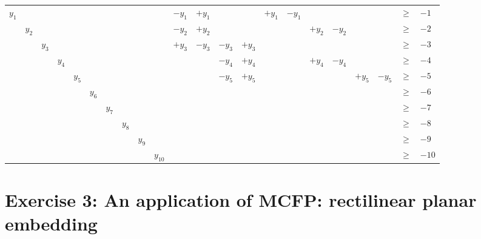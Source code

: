 \documentclass[11pt,a4paper,english]{article}
\begin{document}
\begin{table}[H]
  \begin{tabular}{rrrrrrrrrrrrrrrrrrrrr}
$y_1$  & ~     & ~     & ~     & ~     & ~     & ~     & ~     & ~    & ~     & $-y_1$ & $+y_1$ & ~     & ~     & $+y_1$ & $-y_1$ & ~     & ~      & ~ & ~  & $\geq$ & $-1$\\
~      & $y_2$ & ~     & ~     & ~     & ~     & ~     & ~     & ~    & ~     & $-y_2$ & $+y_2$ & ~     & ~     & ~     & ~      & $+y_2$ & $-y_2$ & ~ & ~  & $\geq$ & $-2$\\
~      & ~     & $y_3$ & ~     & ~     & ~     & ~     & ~     & ~    & ~     & $+y_3$ & $-y_3$ & $-y_3$ & $+y_3$ & ~   & ~      & ~     & ~     & ~ & ~    & $\geq$ & $-3$\\
~      & ~     & ~     & $y_4$ & ~     & ~     & ~     & ~     & ~    & ~     & ~      & ~      & $-y_4$ & $+y_4$ & ~   & ~      & $+y_4$& $-y_4$& ~ & ~    & $\geq$ & $-4$\\
~      & ~     & ~     & ~     & $y_5$ & ~     & ~     & ~     & ~    & ~     & ~      & ~      & $-y_5$ & $+y_5$ & ~   & ~ & ~   & ~     & $+y_5$ & $-y_5$ & $\geq$ & $-5$\\
~      & ~     & ~     & ~     & ~     & $y_6$ & ~     & ~     & ~    & ~     & ~      & ~      & ~     & ~     & ~     & ~      & ~     & ~     & ~ & ~    & $\geq$ & $-6$\\
~      & ~     & ~     & ~     & ~     & ~     & $y_7$ & ~     & ~    & ~     & ~      & ~      & ~     & ~     & ~     & ~      & ~     & ~     & ~ & ~    & $\geq$ & $-7$\\
~      & ~     & ~     & ~     & ~     & ~     & ~     & $y_8$ & ~    & ~     & ~      & ~      & ~     & ~     & ~     & ~      & ~     & ~     & ~ & ~    & $\geq$ & $-8$\\
~      & ~     & ~     & ~     & ~     & ~     & ~     & ~     & $y_9$& ~     & ~      & ~      & ~     & ~     & ~     & ~      & ~     & ~     & ~ & ~    & $\geq$ & $-9$\\
~      & ~     & ~     & ~     & ~     & ~     & ~     & ~     & ~    & $y_10$& ~      & ~      & ~     & ~     & ~     & ~      & ~     & ~     & ~ & ~    & $\geq$ & $-10$\\
  \end{tabular}
\end{table}

\section{Exercise 3: An application of MCFP: rectilinear planar embedding}
\end{document}
